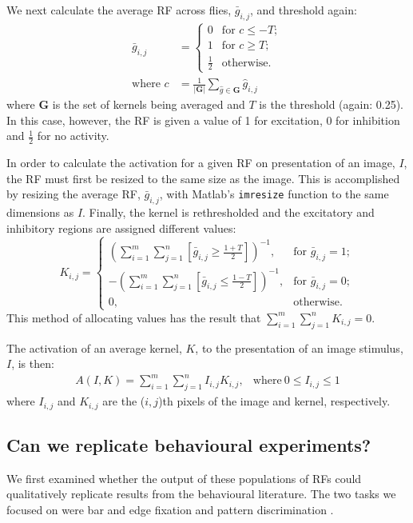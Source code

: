 We next calculate the average \ac{RF} across flies, $\bar{g}_{i,j}$, and threshold again:
\begin{align*}
\bar{g}_{i,j} &= \left\{ \begin{array}{rl}
			0 & \mbox{for } c \le -T; \\
			1 & \mbox{for } c \ge T; \\
			\frac{1}{2} & \mbox{otherwise.} 
			\end{array} \right. \\
\mbox{where } c &= \frac{1}{|\mathbf{G}|}\sum\limits_{\hat{g} \in \mathbf{G}} \hat{g}_{i,j}
\end{align*}
where $\mathbf{G}$ is the set of kernels being averaged and $T$ is the threshold (again: 0.25).
In this case, however, the \ac{RF} is given a value of 1 for excitation, 0 for inhibition and $\frac{1}{2}$ for no activity.

In order to calculate the activation for a given \ac{RF} on presentation of an image, $I$, the \ac{RF} must first be resized to the same size as the image.
This is accomplished by resizing the average \ac{RF}, $\bar{g}_{i,j}$, with Matlab's \texttt{imresize} function to the same dimensions as $I$.
Finally, the kernel is rethresholded and the excitatory and inhibitory regions are assigned different values:
$$
K_{i,j} = \left\{
\begin{array}{rl}
\left( \sum\limits^m_{i=1}\sum\limits^n_{j=1}[\bar{g}_{i,j} \ge \frac{1+T}{2}] \right)^{-1}, & \mbox{for } \bar{g}_{i,j} = 1; \\
-\left( \sum\limits^m_{i=1}\sum\limits^n_{j=1}[\bar{g}_{i,j} \le \frac{1-T}{2}] \right)^{-1}, & \mbox{for } \bar{g}_{i,j} = 0; \\
0, & \mbox{otherwise.}
\end{array}
\right.
$$
This method of allocating values has the result that $\sum\limits_{i=1}^m \sum\limits_{j=1}^n K_{i,j}=0$.

The activation of an average kernel, $K$, to the presentation of an image stimulus, $I$, is then:
$$
\begin{array}{rl}
A(I,K) = {\sum\limits^m_{i=1} \sum\limits^n_{j=1} I_{i,j}K_{i,j}}, &\mathrm{where\ } 0 \le I_{i,j} \le 1
\end{array}
$$
where $I_{i,j}$ and $K_{i,j}$ are the ($i,j$)th pixels of the image and kernel, respectively.

\subsection{Can we replicate behavioural experiments?}
\label{sec:methods:recap}
We first examined whether the output of these populations of \acp{RF} could qualitatively replicate results from the behavioural literature.
The two tasks we focused on were bar and edge fixation \cite{Neuser2008,Osorio1990} and pattern discrimination \cite{Liu2006,Ernst1999}.

